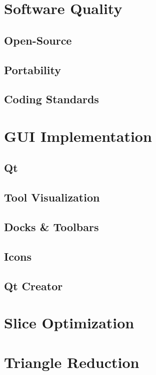 \documentclass{report}
\begin{document}
\begin{appendices}
\chapter{Software Quality}
\section{Open-Source}
\section{Portability}
\section{Coding Standards}

\chapter{GUI Implementation}
\section{Qt}
\section{Tool Visualization}
\section{Docks \& Toolbars}
\section{Icons}
\section{Qt Creator}

\chapter{Slice Optimization}
\chapter{Triangle Reduction}

\end{appendices}
\end{document}
